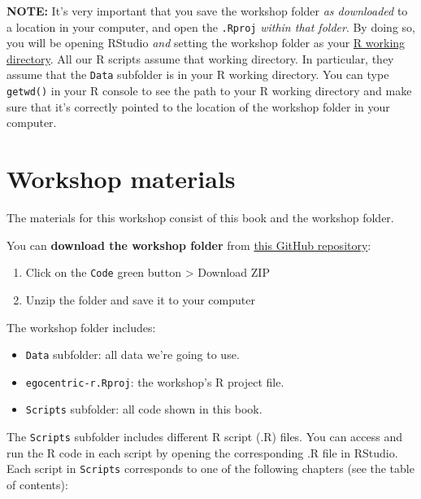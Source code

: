 \documentclass[
]{book}
\providecommand{\tightlist}{%
  \setlength{\itemsep}{0pt}\setlength{\parskip}{0pt}}
\begin{document}
\textbf{NOTE:} It's very important that you save the workshop folder \emph{as downloaded} to a location in your computer, and open the \texttt{.Rproj} \emph{within that folder}. By doing so, you will be opening RStudio \emph{and} setting the workshop folder as your \protect\hyperlink{starting-R-and-loading-packages}{R working directory}. All our R scripts assume that working directory. In particular, they assume that the \texttt{Data} subfolder is in your R working directory. You can type \texttt{getwd()} in your R console to see the path to your R working directory and make sure that it's correctly pointed to the location of the workshop folder in your computer.

\hypertarget{materials}{%
\section{Workshop materials}\label{materials}}

The materials for this workshop consist of this book and the workshop folder.

You can \textbf{download the workshop folder} from \href{https://github.com/raffaelevacca/egocentric-r-book}{this GitHub repository}:

\begin{enumerate}
\def\labelenumi{\arabic{enumi}.}
\tightlist
\item
  Click on the \texttt{Code} green button \textgreater{} Download ZIP
\item
  Unzip the folder and save it to your computer
\end{enumerate}

The workshop folder includes:

\begin{itemize}
\tightlist
\item
  \texttt{Data} subfolder: all data we're going to use.
\item
  \texttt{egocentric-r.Rproj}: the workshop's R project file.
\item
  \texttt{Scripts} subfolder: all code shown in this book.
\end{itemize}

The \texttt{Scripts} subfolder includes different R script (.R) files. You can access and run the R code in each script by opening the corresponding .R file in RStudio. Each script in \texttt{Scripts} corresponds to one of the following chapters (see the table of contents):
\end{document}
